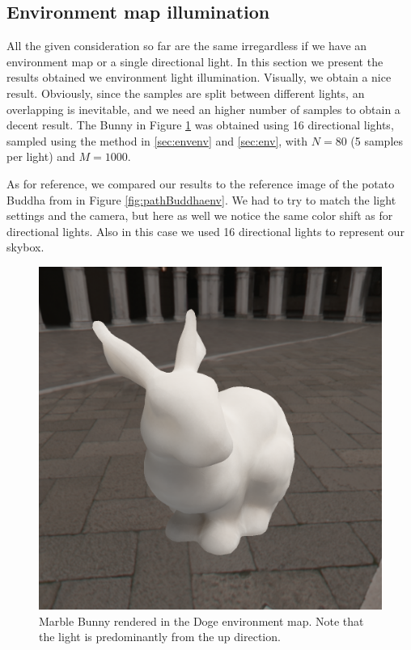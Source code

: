 \subsection{Environment map illumination}

All the given consideration so far are the same irregardless if we have an environment map or a single directional light. In this section we present the results obtained we environment light illumination. Visually, we obtain a nice result. Obviously, since the samples are split between different lights, an overlapping is inevitable, and we need an higher number of samples to obtain a decent result. The Bunny in Figure \ref{fig:Bunnyenv1} was obtained using 16 directional lights, sampled using the method in \ref{sec:envenv} and \ref{sec:env}, with $N = 80$ (5 samples per light) and $M = 1000$. 

As for reference, we compared our results to the reference image of the potato Buddha from \cite{IMM2013-06646} in Figure \ref{fig:pathBuddhaenv}. We had to try to match the light settings and the camera, but here as well we notice the same color shift as for directional lights. Also in this case we used 16 directional lights to represent our skybox.

\begin{figure}[!h]
\centering
\includegraphics[width=0.7 \linewidth]{images/results/Bunny_env_80_1000_nobias.png}
\caption{Marble Bunny rendered in the Doge environment map. Note that the light is predominantly from the up direction.}
\label{fig:Bunnyenv1}
\end{figure}



